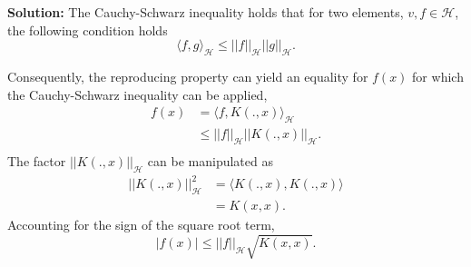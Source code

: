 \documentclass{article}[12pt]
\begin{document}
\textbf{Solution:} The Cauchy-Schwarz inequality holds that for two elements, $v, f \in \mathcal H$, the following condition holds 
\begin{equation}
	\langle f, g \rangle_{\mathcal H} \le || f ||_{\mathcal H} || g ||_{\mathcal H}.
\end{equation}

Consequently, the reproducing property can yield an equality for $f(x)$ for which the Cauchy-Schwarz inequality can be applied,
\begin{equation}
	\begin{aligned}
		f(x) &= \langle f, K(., x) \rangle_{\mathcal H} \\
		     &\le || f||_{\mathcal H} ||K(., x)||_{\mathcal H}. \\
	\end{aligned}
\end{equation}
The factor $|| K(., x) ||_{\mathcal H}$ can be manipulated as
\begin{equation}
	\begin{aligned}
	|| K(., x) ||^2_{\mathcal H} &= \langle K(., x), K(., x) \rangle \\
				     &= K(x, x).
	\end{aligned}
\end{equation}
Accounting for the sign of the square root term,
\begin{equation}
	|f(x)| \le ||f||_{\mathcal H} \sqrt{K(x,x)}.
\end{equation}
\end{document}
